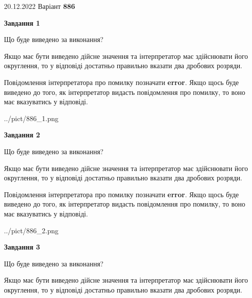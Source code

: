 \documentclass[12pt, ukrainian]{article}
\begin{document}
{20.12.2022 Варіант \No \textbf { 886 }\par}
{
\begin {Large}

{\begin {center}\textbf{Завдання 1}\end {center}}\par
Що буде виведено за виконання? \par

Якщо має бути виведено дійсне значення та інтерпретатор має здійснювати його округлення, 
то у відповіді достатньо правильно вказати два дробових розряди.

Повідомлення інтерпретатора про помилку позначати \textbf{error}.
Якщо щось буде виведено до того, як інтерпретатор видасть повідомлення про помилку, 
то воно має вказуватись у відповіді. \par

\begin{center}
	{../pict/886_1.png}
\end{center}
\newpage

{\begin {center}\textbf{Завдання 2}\end {center}}\par
Що буде виведено за виконання? \par

Якщо має бути виведено дійсне значення та інтерпретатор має здійснювати його округлення, 
то у відповіді достатньо правильно вказати два дробових розряди.

Повідомлення інтерпретатора про помилку позначати \textbf{error}.
Якщо щось буде виведено до того, як інтерпретатор видасть повідомлення про помилку, 
то воно має вказуватись у відповіді. \par

\begin{center}
	{../pict/886_2.png}
\end{center}
\newpage

{\begin {center}\textbf{Завдання 3}\end {center}}\par
Що буде виведено за виконання? \par

Якщо має бути виведено дійсне значення та інтерпретатор має здійснювати його округлення, 
то у відповіді достатньо правильно вказати два дробових розряди.


\end{Large}}
\end{document}
